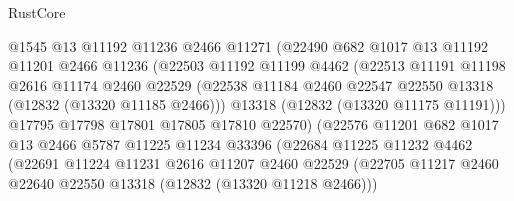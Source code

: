 \begin{lexlean}{RustCore}
\begin{coremodule}
                          @1545
                          @13
                          @11192
                          @11236
                          @2466
                          @11271
                          (@22490
                            @682
                            @1017
                            @13
                            @11192
                            @11201
                            @2466
                            @11236
                            (@22503
                              @11192
                              @11199
                              @4462
                              (@22513
                                @11191
                                @11198
                                @2616
                                @11174
                                @2460
                                @22529
                                (@22538
                                  @11184
                                  @2460
                                  @22547
                                  @22550
                                  @13318
                                  (@12832 (@13320 @11185 @2466)))
                                @13318
                                (@12832 (@13320 @11175 @11191)))
                              @17795
                              @17798
                              @17801
                              @17805
                              @17810
                              @22570)
                            (@22576
                              @11201
                              @682
                              @1017
                              @13
                              @2466
                              @5787
                              @11225
                              @11234
                              @33396
                              (@22684
                                @11225
                                @11232
                                @4462
                                (@22691
                                  @11224
                                  @11231
                                  @2616
                                  @11207
                                  @2460
                                  @22529
                                  (@22705
                                    @11217
                                    @2460
                                    @22640
                                    @22550
                                    @13318
                                    (@12832 (@13320 @11218 @2466)))

\end{coremodule}
\end{lexlean}
